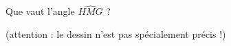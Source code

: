 
\begin{exercice}\label{exosmath-0913}

    Que vaut l'angle \( \widehat{HMG}\) ?

    \begin{center}
    
    \end{center}

    (attention : le dessin n'est pas spécialement précis !)

\end{exercice}
